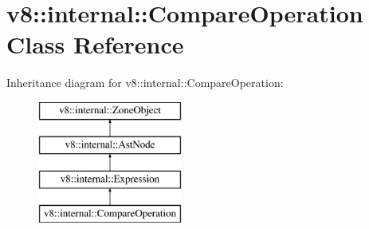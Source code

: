 \hypertarget{classv8_1_1internal_1_1_compare_operation}{}\section{v8\+:\+:internal\+:\+:Compare\+Operation Class Reference}
\label{classv8_1_1internal_1_1_compare_operation}
Inheritance diagram for v8\+:\+:internal\+:\+:Compare\+Operation\+:\begin{figure}[H]
\begin{center}
\leavevmode
\includegraphics[height=4.000000cm]{classv8_1_1internal_1_1_compare_operation}
\end{center}
\end{figure}
